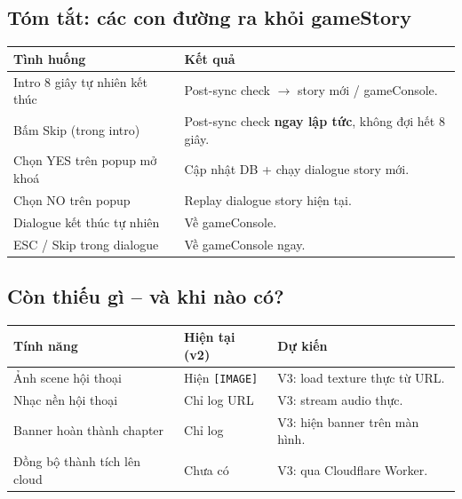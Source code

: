 \documentclass[12pt,a4paper]{article}
\begin{document}
\subsection{Tóm tắt: các con đường ra khỏi gameStory}

\vspace{4pt}
\begin{tabularx}{\linewidth}{|l|X|}
    \hline
    \textbf{Tình huống}                      & \textbf{Kết quả} \\
    \hline
    Intro 8 giây tự nhiên kết thúc         & Post-sync check $\rightarrow$
                                             story mới / gameConsole. \\
    \hline
    Bấm Skip (trong intro)                 & Post-sync check \textbf{ngay lập tức},
                                             không đợi hết 8 giây. \\
    \hline
    Chọn YES trên popup mở khoá            & Cập nhật DB + chạy dialogue story mới. \\
    \hline
    Chọn NO trên popup                     & Replay dialogue story hiện tại. \\
    \hline
    Dialogue kết thúc tự nhiên             & Về gameConsole. \\
    \hline
    ESC / Skip trong dialogue              & Về gameConsole ngay. \\
    \hline
\end{tabularx}

\subsection{Còn thiếu gì -- và khi nào có?}

\vspace{4pt}
\begin{tabularx}{\linewidth}{|l|l|X|}
    \hline
    \textbf{Tính năng}          & \textbf{Hiện tại (v2)}  & \textbf{Dự kiến} \\
    \hline
    Ảnh scene hội thoại          & Hiện \texttt{[IMAGE]}   & V3: load texture thực từ URL. \\
    \hline
    Nhạc nền hội thoại           & Chỉ log URL             & V3: stream audio thực. \\
    \hline
    Banner hoàn thành chapter    & Chỉ log                 & V3: hiện banner trên màn hình. \\
    \hline
    Đồng bộ thành tích lên cloud & Chưa có                 & V3: qua Cloudflare Worker. \\
    \hline
\end{tabularx}

\label{LastPageGameStoryGuide}
\end{document}
